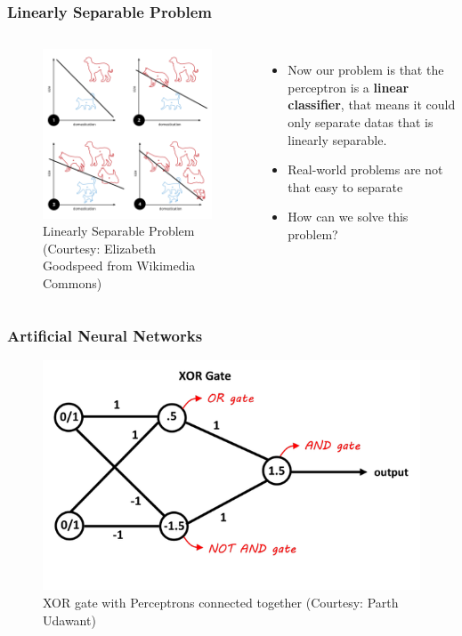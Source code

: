 \documentclass[aspectratio=169]{beamer}
\begin{document}
\begin{frame}
	\frametitle{Linearly Separable Problem}
	\begin{columns}
		\begin{figure}
			\includegraphics[width=0.7\linewidth,height=0.7\textheight,keepaspectratio]{imgs/linsep.png}
			\caption{Linearly Separable Problem (Courtesy: Elizabeth Goodspeed from Wikimedia Commons)}
		\end{figure}
		\begin{itemize}
			\item Now our problem is that the perceptron is a \textbf{linear classifier}, that means it could only separate datas that is linearly separable.
			\item Real-world problems are not that easy to separate
			\item How can we solve this problem?
		\end{itemize}
	\end{columns}
\end{frame}

\begin{frame}
	\frametitle{Artificial Neural Networks}
	\begin{center}
		\begin{figure}
			\includegraphics[width=0.7\linewidth,height=0.7\textheight,keepaspectratio]{imgs/xor_nn.png}
			\caption{XOR gate with Perceptrons connected together (Courtesy: Parth Udawant)}
		\end{figure}
	\end{center}
\end{frame}
\end{document}
